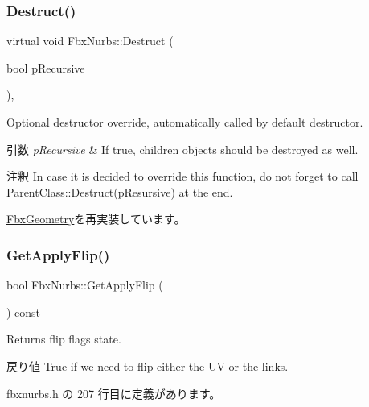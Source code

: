 \subsubsection{\texorpdfstring{Destruct()}{Destruct()}}
{\footnotesize\ttfamily virtual void Fbx\+Nurbs\+::\+Destruct (\begin{DoxyParamCaption}\item[{bool}]{p\+Recursive }\end{DoxyParamCaption})\hspace{0.3cm}{\ttfamily [protected]}, {\ttfamily [virtual]}}

Optional destructor override, automatically called by default destructor. 
\begin{DoxyParams}{引数}
{\em p\+Recursive} & If true, children objects should be destroyed as well. \\
\hline
\end{DoxyParams}
\begin{DoxyRemark}{注釈}
In case it is decided to override this function, do not forget to call Parent\+Class\+::\+Destruct(p\+Resursive) at the end. 
\end{DoxyRemark}


\hyperlink{class_fbx_geometry_a07e94f7801067d66429afbf1799795cd}{Fbx\+Geometry}を再実装しています。

\mbox{\label{class_fbx_nurbs_a5078e2c4f27160149e19cac9c0352ceb}} 
\subsubsection{\texorpdfstring{Get\+Apply\+Flip()}{GetApplyFlip()}}
{\footnotesize\ttfamily bool Fbx\+Nurbs\+::\+Get\+Apply\+Flip (\begin{DoxyParamCaption}{ }\end{DoxyParamCaption}) const\hspace{0.3cm}{\ttfamily [inline]}}

Returns flip flags state. \begin{DoxyReturn}{戻り値}
{\ttfamily True} if we need to flip either the UV or the links. 
\end{DoxyReturn}


 fbxnurbs.\+h の 207 行目に定義があります。

\mbox{\label{class_fbx_nurbs_a7b3adc47808af1078b0d3865cc464b4a}} 
